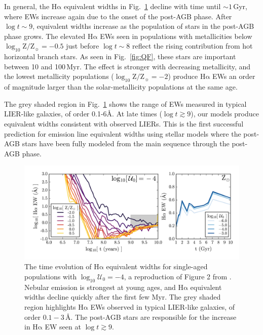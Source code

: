 \documentclass[preprint2]{aastex62}
\newcommand{\ha}{\ensuremath{\mathrm{H\alpha}}\xspace}
\newcommand{\logten}{\ensuremath{\log_{10}}}
\newcommand{\logZeq}[1]{\ensuremath{\logten \mathrm{Z}/\mathrm{Z}_{\sun} = #1}}
\newcommand{\ang}{\ensuremath{\mbox{\AA}}\xspace}
\newcommand{\logUeq}[1]{\ensuremath{\logten \mathcal{U}_0 = #1}}
\newcommand{\Myr}{$\,$Myr\xspace}
\newcommand{\Gyr}{$\,$Gyr\xspace}
\begin{document}
In general, the \ha equivalent widths in Fig.~\ref{fig:EW} decline with time until ${\sim}1$\Gyr, where EWs increase again due to the onset of the post-AGB phase. After $\log t \sim 9$, equivalent widths increase as the population of stars in the post-AGB phase grows. The elevated \ha EWs seen in populations with metallicities below \logZeq{-0.5} just before $\log t \sim 8$ reflect the rising contribution from hot horizontal branch stars. As seen in Fig.~\ref{fig:QF}, these stars are important between 10 and 100\Myr. The effect is stronger with decreasing metallicity, and the lowest metallicity populations (\logZeq{-2}) produce \ha EWs an order of magnitude larger than the solar-metallicity populations at the same age. 

The grey shaded region in Fig.~\ref{fig:EW} shows the range of EWs measured in typical LIER-like galaxies, of order 0.1-6\ang. At late times ($\log t \gtrsim 9$), our models produce equivalent widths consistent with observed LIERs. This is the first successful prediction for emission line equivalent widths using stellar models where the post-AGB stars have been fully modeled from the main sequence through the post-AGB phase.


\begin{figure}
  \begin{center}
    \includegraphics[width=\linewidth]{figs/f5.png}
    \caption{The time evolution of \ha equivalent widths for single-aged populations with \logUeq{-4}, a reproduction of Figure 2 from \citet{Belfiore+2016}. Nebular emission is strongest at young ages, and \ha equivalent widths decline quickly after the first few Myr. The grey shaded region highlights \ha EWs observed in typical LIER-like galaxies, of order $0.1-3\,$\ang. The post-AGB stars are responsible for the increase in \ha EW seen at $\log t \gtrsim 9$.}
    \label{fig:EW}
  \end{center}
\end{figure}
\end{document}
